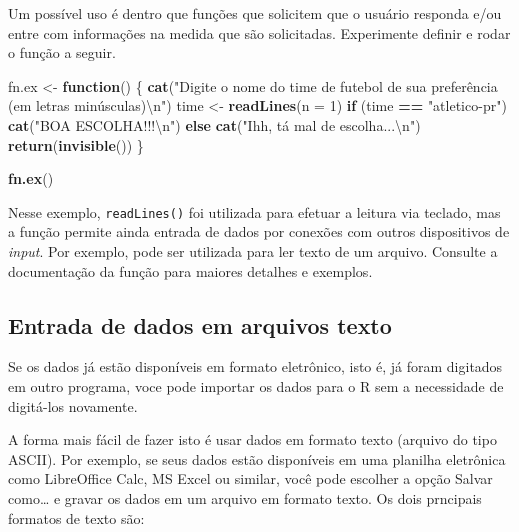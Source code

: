 \documentclass[10pt,a4paper]{book}
\newenvironment{Shaded}{\begin{snugshade}}{\end{snugshade}}
\newcommand{\KeywordTok}[1]{\textcolor[rgb]{0.13,0.29,0.53}{\textbf{#1}}}
\newcommand{\DataTypeTok}[1]{\textcolor[rgb]{0.13,0.29,0.53}{#1}}
\newcommand{\DecValTok}[1]{\textcolor[rgb]{0.00,0.00,0.81}{#1}}
\newcommand{\CharTok}[1]{\textcolor[rgb]{0.31,0.60,0.02}{#1}}
\newcommand{\StringTok}[1]{\textcolor[rgb]{0.31,0.60,0.02}{#1}}
\newcommand{\ControlFlowTok}[1]{\textcolor[rgb]{0.13,0.29,0.53}{\textbf{#1}}}
\newcommand{\OperatorTok}[1]{\textcolor[rgb]{0.81,0.36,0.00}{\textbf{#1}}}
\newcommand{\NormalTok}[1]{#1}
\begin{document}
Um possível uso é dentro que funções que solicitem que o usuário
responda e/ou entre com informações na medida que são solicitadas.
Experimente definir e rodar o função a seguir.

\begin{Shaded}
\begin{Highlighting}[]
\NormalTok{fn.ex <-}\StringTok{ }\ControlFlowTok{function}\NormalTok{() \{}
    \KeywordTok{cat}\NormalTok{(}\StringTok{"Digite o nome do time de futebol de sua preferência (em letras minúsculas)}\CharTok{\textbackslash{}n}\StringTok{"}\NormalTok{)}
\NormalTok{    time <-}\StringTok{ }\KeywordTok{readLines}\NormalTok{(}\DataTypeTok{n =} \DecValTok{1}\NormalTok{)}
    \ControlFlowTok{if}\NormalTok{ (time }\OperatorTok{==}\StringTok{ "atletico-pr"}\NormalTok{)}
        \KeywordTok{cat}\NormalTok{(}\StringTok{"BOA ESCOLHA!!!}\CharTok{\textbackslash{}n}\StringTok{"}\NormalTok{)}
    \ControlFlowTok{else} \KeywordTok{cat}\NormalTok{(}\StringTok{"Ihh, tá mal de escolha...}\CharTok{\textbackslash{}n}\StringTok{"}\NormalTok{)}
    \KeywordTok{return}\NormalTok{(}\KeywordTok{invisible}\NormalTok{())}
\NormalTok{\}}
\end{Highlighting}
\end{Shaded}

\begin{Shaded}
\begin{Highlighting}[]
\KeywordTok{fn.ex}\NormalTok{()}
\end{Highlighting}
\end{Shaded}

Nesse exemplo, \texttt{readLines()} foi utilizada para efetuar a leitura
via teclado, mas a função permite ainda entrada de dados por conexões
com outros dispositivos de \emph{input}. Por exemplo, pode ser utilizada
para ler texto de um arquivo. Consulte a documentação da função para
maiores detalhes e exemplos.

\subsection{Entrada de dados em arquivos
texto}\label{entrada-de-dados-em-arquivos-texto}

Se os dados já estão disponíveis em formato eletrônico, isto é, já foram
digitados em outro programa, voce pode importar os dados para o R sem a
necessidade de digitá-los novamente.

A forma mais fácil de fazer isto é usar dados em formato texto (arquivo
do tipo ASCII). Por exemplo, se seus dados estão disponíveis em uma
planilha eletrônica como LibreOffice Calc, MS Excel ou similar, você
pode escolher a opção Salvar como\ldots{} e gravar os dados em um
arquivo em formato texto. Os dois prncipais formatos de texto são:
\end{document}

